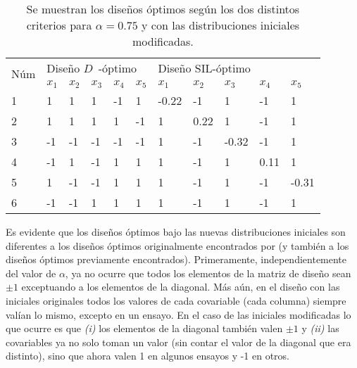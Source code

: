 \begin{table}[h]
\small
\centering
\begin{tabular}{l|lllll|lllll}
\multirow{2}{*}{Núm} & \multicolumn{5}{l|}{ \hspace{1.2cm} Diseño $D$~-óptimo} & \multicolumn{5}{l}{  \hspace{1cm}  Diseño SIL-óptimo}  \\
                     & $x_1$  & $x_2$ & $x_3$ & $x_4$ & $x_5$ & $x_1$ & $x_2$ & $x_3$ & $x_4$ & $x_5$  \\ \hline
1                    & 1  & 1    & 1     & -1    & 1     & -0.22  & -1    & 1     & -1    & 1      \\
2                    & 1      & 1  & 1     & 1    & -1     & 1     & 0.22  & 1     & -1    & 1      \\
3                    & -1      & -1    & -1  & -1    & -1     & 1     & -1    & -0.32 & -1    & 1      \\
4                    & -1      & 1    & -1     & 1  & 1     & 1     & -1    & 1     & 0.11  & 1      \\
5                    & 1      & -1    & -1     & 1    & 1 & 1     & -1    & 1     & -1    & -0.31 \\
6                    & -1      & -1    & 1     & 1    & 1     & 1     & -1    & 1     & -1    & 1     
\end{tabular}
\caption{Se muestran los diseños óptimos según los dos distintos criterios para $\alpha = 0.75$ y con las distribuciones iniciales modificadas.}
\label{table:alfa75_modified}
\end{table}


Es evidente que los diseños óptimos bajo las nuevas distribuciones iniciales son diferentes a los diseños óptimos originalmente encontrados por \cite{Woods_etal} (y también a los diseños óptimos previamente encontrados). Primeramente, independientemente del valor de $\alpha$, ya no ocurre que todos los elementos de la matriz de diseño sean $\pm 1$ exceptuando a los elementos de la diagonal. Más aún, en el diseño con las iniciales originales todos los valores de cada covariable (cada columna) siempre valían lo mismo, excepto en un ensayo. En el caso de las iniciales modificadas lo que ocurre es que \textit{(i)} los elementos de la diagonal también valen $\pm 1$ y \textit{(ii)} las covariables ya no solo toman un valor (sin contar el valor de la diagonal que era distinto), sino que ahora valen 1 en algunos ensayos y -1 en otros. \\

